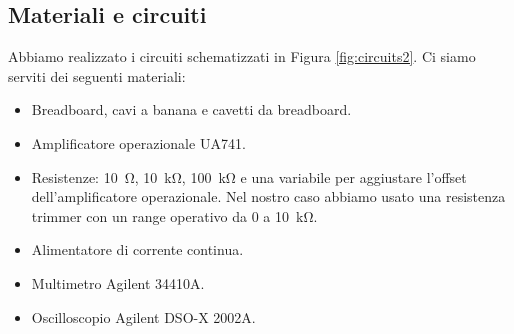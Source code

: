 \subsection{Materiali e circuiti}

Abbiamo realizzato i circuiti schematizzati in Figura \ref{fig:circuits2}.
Ci siamo serviti dei seguenti materiali:

\begin{itemize}
    \item{Breadboard, cavi a banana e cavetti da breadboard.}
    \item{Amplificatore operazionale UA741.}
    \item{Resistenze: \SI{10}{\ohm}, \SI{10}{\kilo\ohm}, \SI{100}{\kilo\ohm}
        e una variabile per aggiustare l'offset dell'amplificatore operazionale.
        Nel nostro caso abbiamo usato una resistenza trimmer con un range operativo da 0
        a \SI{10}{\kilo\ohm}.}
    \item{Alimentatore di corrente continua.}
    \item{Multimetro Agilent 34410A.}
    \item{Oscilloscopio Agilent DSO-X 2002A.}
\end{itemize}

